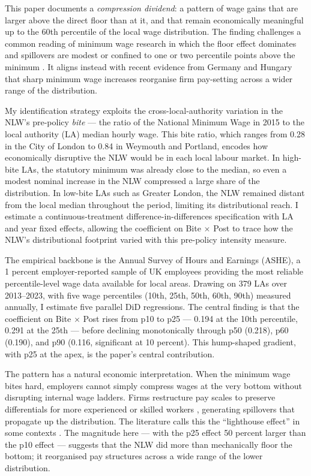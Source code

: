 \documentclass[12pt]{article}
\begin{document}
This paper documents a \textit{compression dividend}: a pattern of wage gains that are larger above the direct floor than at it, and that remain economically meaningful up to the 60th percentile of the local wage distribution. The finding challenges a common reading of minimum wage research in which the floor effect dominates and spillovers are modest or confined to one or two percentile points above the minimum \citep{card1994minimum}. It aligns instead with recent evidence from Germany \citep{dustmann2022reallocation} and Hungary \citep{harasztosi2019pays} that sharp minimum wage increases reorganise firm pay-setting across a wider range of the distribution.

My identification strategy exploits the cross-local-authority variation in the NLW's pre-policy \textit{bite} --- the ratio of the National Minimum Wage in 2015 to the local authority (LA) median hourly wage. This bite ratio, which ranges from 0.28 in the City of London to 0.84 in Weymouth and Portland, encodes how economically disruptive the NLW would be in each local labour market. In high-bite LAs, the statutory minimum was already close to the median, so even a modest nominal increase in the NLW compressed a large share of the distribution. In low-bite LAs such as Greater London, the NLW remained distant from the local median throughout the period, limiting its distributional reach. I estimate a continuous-treatment difference-in-differences specification with LA and year fixed effects, allowing the coefficient on Bite $\times$ Post to trace how the NLW's distributional footprint varied with this pre-policy intensity measure.

The empirical backbone is the Annual Survey of Hours and Earnings (ASHE), a 1 percent employer-reported sample of UK employees providing the most reliable percentile-level wage data available for local areas. Drawing on 379 LAs over 2013--2023, with five wage percentiles (10th, 25th, 50th, 60th, 90th) measured annually, I estimate five parallel DiD regressions. The central finding is that the coefficient on Bite $\times$ Post rises from p10 to p25 --- 0.194 at the 10th percentile, 0.291 at the 25th --- before declining monotonically through p50 (0.218), p60 (0.190), and p90 (0.116, significant at 10 percent). This hump-shaped gradient, with p25 at the apex, is the paper's central contribution.

The pattern has a natural economic interpretation. When the minimum wage bites hard, employers cannot simply compress wages at the very bottom without disrupting internal wage ladders. Firms restructure pay scales to preserve differentials for more experienced or skilled workers \citep{autor2016contribution, dube2019minimum}, generating spillovers that propagate up the distribution. The literature calls this the ``lighthouse effect'' in some contexts \citep{manning2021elusive}. The magnitude here --- with the p25 effect 50 percent larger than the p10 effect --- suggests that the NLW did more than mechanically floor the bottom; it reorganised pay structures across a wide range of the lower distribution.
\end{document}
